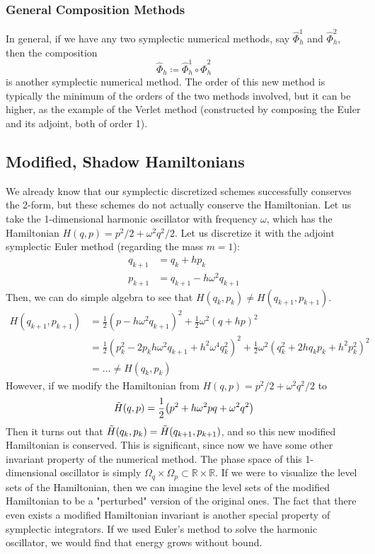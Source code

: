 \documentclass{article}
\theoremstyle{remark}
\theoremstyle{definition}
\begin{document}
\subsubsection{General Composition Methods}
In general, if we have any two symplectic numerical methods, say $\hat{\Phi}_h^1$ and $\hat{\Phi}_h^2$, then the composition 
\[\hat{\Phi}_h \coloneqq \hat{\Phi}_h^1 \circ \hat{\Phi}_h^2\]
is another symplectic numerical method. The order of this new method is typically the minimum of the orders of the two methods involved, but it can be higher, as the example of the Verlet method (constructed by composing the Euler and its adjoint, both of order 1). 


\subsection{Modified, Shadow Hamiltonians}
We already know that our symplectic discretized schemes successfully conserves the 2-form, but these schemes do not actually conserve the Hamiltonian. Let us take the 1-dimensional harmonic oscillator with frequency $\omega$, which has the Hamiltonian $H(q, p) = p^2/2 + \omega^2 q^2/2$. Let us discretize it with the adjoint symplectic Euler method (regarding the mass $m = 1$): 
\begin{align*}
    q_{k+1} & = q_k + h p_k \\ 
    p_{k+1} & = q_{k+1} - h \omega^2 q_{k+1}
\end{align*}
Then, we can do simple algebra to see that $H(q_k, p_k) \neq H(q_{k+1}, p_{k+1})$. 
\begin{align*}
    H(q_{k+1}, p_{k+1}) & = \frac{1}{2} (p - h \omega^2 q_{k+1})^2 + \frac{1}{2} \omega^2 (q + h p)^2 \\
    & = \frac{1}{2} (p_k^2 - 2p_kh \omega^2 q_{k+1} + h^2 \omega^4 q_k^2)^2 + \frac{1}{2} \omega^2 (q_k^2 + 2hq_k p_k + h^2 p_k^2)^2 \\
    &  = \ldots \neq H(q_k, p_k) 
\end{align*}
However, if we modify the Hamiltonian from $H(q, p) = p^2 /2 + \omega^2 q^2 / 2$ to 
\[\Tilde{H} (q, p) = \frac{1}{2} \big( p^2 + h \omega^2 p q + \omega^2 q^2 \big)\]
Then it turns out that $\Tilde{H}(q_k, p_k) = \Tilde{H}(q_{k+1}, p_{k+1})$, and so this new modified Hamiltonian is conserved. This is significant, since now we have some other invariant property of the numerical method. The phase space of this 1-dimensional oscillator is simply $\Omega_q \times \Omega_p \subset \mathbb{R} \times \mathbb{R}$. If we were to visualize the level sets of the Hamiltonian, then we can imagine the level sets of the modified Hamiltonian to be a "perturbed" version of the original ones. The fact that there even exists a modified Hamiltonian invariant is another special property of symplectic integrators. If we used Euler's method to solve the harmonic oscillator, we would find that energy grows without bound. 
\end{document}
